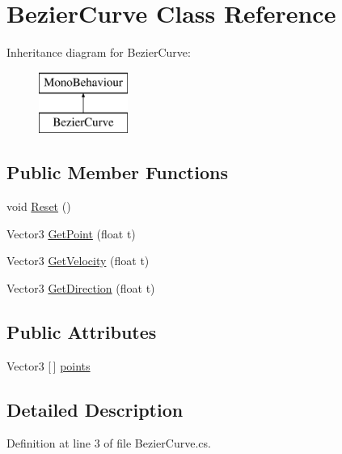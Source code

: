 \hypertarget{class_bezier_curve}{}\section{Bezier\+Curve Class Reference}
\label{class_bezier_curve}
Inheritance diagram for Bezier\+Curve\+:\begin{figure}[H]
\begin{center}
\leavevmode
\includegraphics[height=2.000000cm]{class_bezier_curve}
\end{center}
\end{figure}
\subsection*{Public Member Functions}
\begin{DoxyCompactItemize}
\item 
void \mbox{\hyperlink{class_bezier_curve_a75b57f3aa46a6bb6679dfa79262e29ad}{Reset}} ()
\item 
Vector3 \mbox{\hyperlink{class_bezier_curve_a0ac697a04b35213e11d9c93a183ee7fe}{Get\+Point}} (float t)
\item 
Vector3 \mbox{\hyperlink{class_bezier_curve_a3b39e1db5e230d6c4a89ec0386779efa}{Get\+Velocity}} (float t)
\item 
Vector3 \mbox{\hyperlink{class_bezier_curve_aee84a49317214403c6f59c2a60903662}{Get\+Direction}} (float t)
\end{DoxyCompactItemize}
\subsection*{Public Attributes}
\begin{DoxyCompactItemize}
\item 
Vector3 \mbox{[}$\,$\mbox{]} \mbox{\hyperlink{class_bezier_curve_a77f62121b4b7ffb30b169d91691ebcbf}{points}}
\end{DoxyCompactItemize}


\subsection{Detailed Description}


Definition at line 3 of file Bezier\+Curve.\+cs.



